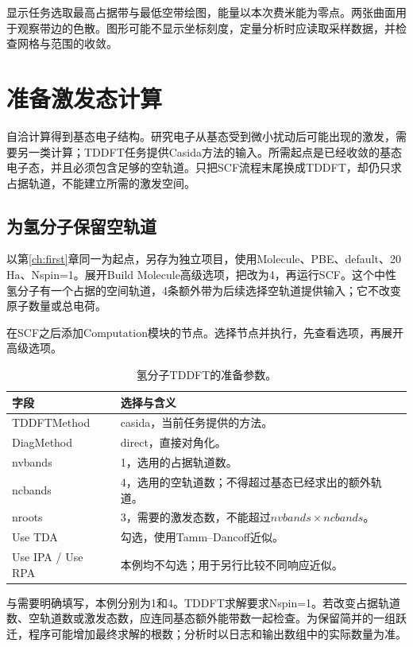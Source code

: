 显示任务选取最高占据带与最低空带绘图，能量以本次费米能为零点。两张曲面用于观察带边的色散。图形可能不显示坐标刻度，定量分析时应读取采样数据，并检查网格与范围的收敛。


\section{准备激发态计算}\label{sec:tddft-workflow}

自洽计算得到基态电子结构。研究电子从基态受到微小扰动后可能出现的激发，需要另一类计算；TDDFT任务提供Casida方法的输入。所需起点是已经收敛的基态电子态，并且必须包含足够的空轨道。只把SCF流程末尾换成TDDFT，却仍只求占据轨道，不能建立所需的激发空间。

\subsection{为氢分子保留空轨道}

以第\ref{ch:first}章同一为起点，另存为独立项目，使用Molecule、PBE、default、20 Ha、Nspin=1。展开Build Molecule高级选项，把改为4，再运行SCF。这个中性氢分子有一个占据的空间轨道，4条额外带为后续选择空轨道提供输入；它不改变原子数量或总电荷。

在SCF之后添加Computation模块的节点。选择节点并执行，先查看选项，再展开高级选项。

\begin{table}[htbp]
\centering
\caption{氢分子TDDFT的准备参数。}
\begin{tabularx}{\linewidth}{lX}
\toprule
字段 & 选择与含义 \\
\midrule
TDDFTMethod & casida，当前任务提供的方法。 \\
DiagMethod & direct，直接对角化。 \\
nvbands & 1，选用的占据轨道数。 \\
ncbands & 4，选用的空轨道数；不得超过基态已经求出的额外轨道。 \\
nroots & 3，需要的激发态数，不能超过$nvbands\times ncbands$。 \\
Use TDA & 勾选，使用Tamm--Dancoff近似。 \\
Use IPA / Use RPA & 本例均不勾选；用于另行比较不同响应近似。 \\
\bottomrule
\end{tabularx}
\end{table}

与需要明确填写，本例分别为1和4。TDDFT求解要求Nspin=1。若改变占据轨道数、空轨道数或激发态数，应连同基态额外能带数一起检查。为保留简并的一组跃迁，程序可能增加最终求解的根数；分析时以日志和输出数组中的实际数量为准。

